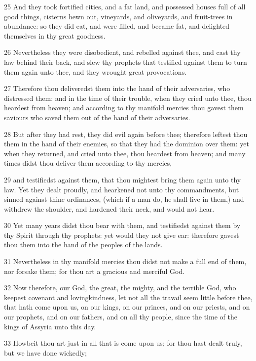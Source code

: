 \par 25 And they took fortified cities, and a fat land, and possessed houses full of all good things, cisterns hewn out, vineyards, and oliveyards, and fruit-trees in abundance: so they did eat, and were filled, and became fat, and delighted themselves in thy great goodness.
\par 26 Nevertheless they were disobedient, and rebelled against thee, and cast thy law behind their back, and slew thy prophets that testified against them to turn them again unto thee, and they wrought great provocations.
\par 27 Therefore thou deliveredst them into the hand of their adversaries, who distressed them: and in the time of their trouble, when they cried unto thee, thou heardest from heaven; and according to thy manifold mercies thou gavest them saviours who saved them out of the hand of their adversaries.
\par 28 But after they had rest, they did evil again before thee; therefore leftest thou them in the hand of their enemies, so that they had the dominion over them: yet when they returned, and cried unto thee, thou heardest from heaven; and many times didst thou deliver them according to thy mercies,
\par 29 and testifiedst against them, that thou mightest bring them again unto thy law. Yet they dealt proudly, and hearkened not unto thy commandments, but sinned against thine ordinances, (which if a man do, he shall live in them,) and withdrew the shoulder, and hardened their neck, and would not hear.
\par 30 Yet many years didst thou bear with them, and testifiedst against them by thy Spirit through thy prophets: yet would they not give ear: therefore gavest thou them into the hand of the peoples of the lands.
\par 31 Nevertheless in thy manifold mercies thou didst not make a full end of them, nor forsake them; for thou art a gracious and merciful God.
\par 32 Now therefore, our God, the great, the mighty, and the terrible God, who keepest covenant and lovingkindness, let not all the travail seem little before thee, that hath come upon us, on our kings, on our princes, and on our priests, and on our prophets, and on our fathers, and on all thy people, since the time of the kings of Assyria unto this day.
\par 33 Howbeit thou art just in all that is come upon us; for thou hast dealt truly, but we have done wickedly;

